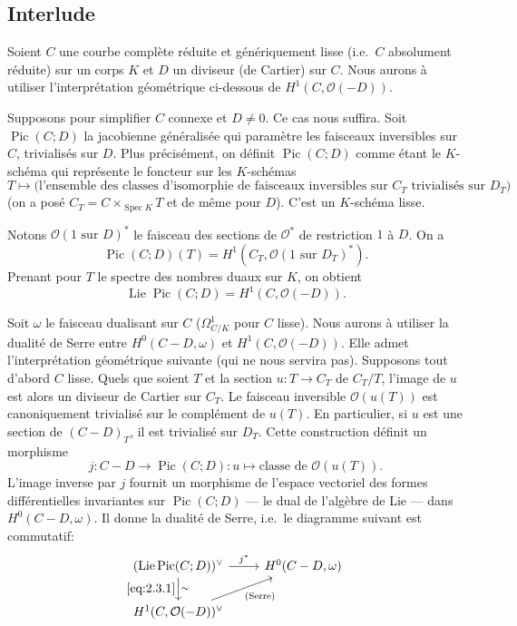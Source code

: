 \documentclass[12pt,a4paper]{article}
\theoremstyle{plain}
\theoremstyle{definition}
\theoremstyle{remark}
\DeclareMathOperator{\Spec}{Spec}
\DeclareMathOperator{\Lie}{Lie}
\DeclareMathOperator{\Pic}{Pic}
\newcommand{\OO}{\mathcal{O}}
\providecommand{\Spec}{\operatorname{Spec}}
\providecommand{\Lie}{\operatorname{Lie}}
\begin{document}
\subsection{Interlude}

Soient $C$ une courbe complète réduite et génériquement lisse (i.e.\ $C$
absolument réduite) sur un corps $K$ et $D$ un diviseur (de Cartier) sur $C$. Nous
aurons à utiliser l'interprétation géométrique ci-dessous de $H^1(C,\OO(-D))$.

Supposons pour simplifier $C$ connexe et $D\neq 0$. Ce cas nous suffira. Soit
$\Pic(C;D)$ la jacobienne généralisée qui paramètre les faisceaux inversibles sur
$C$, trivialisés sur $D$. Plus précisément, on définit $\Pic(C;D)$ comme étant le $K$-
schéma qui représente le foncteur sur les $K$-schémas
\[
T\mapsto\text{(l'ensemble des classes d'isomorphie de faisceaux inversibles sur $C_T$ trivialisés sur $D_T$)}
\]
(on a posé $C_T=C\times_{\Spec K}T$ et de même pour $D$). C'est un $K$-schéma lisse.

Notons $\OO(\text{1 sur }D)^*$ le faisceau des sections de $\OO^*$ de restriction $1$ à $D$. On a
\[
\Pic(C;D)(T)=H^1(C_T,\OO(\text{1 sur }D_T)^*).
\]
Prenant pour $T$ le spectre des nombres duaux sur $K$, on obtient
\begin{equation}\label{eq:2.3.1}
\Lie\Pic(C;D)=H^1(C,\OO(-D)).
\end{equation}

Soit $\omega$ le faisceau dualisant sur $C$ ($\Omega^1_{C/K}$ pour $C$ lisse). Nous aurons à
utiliser la dualité de Serre entre $H^0(C-D,\omega)$ et $H^1(C,\OO(-D))$. Elle admet
l'interprétation géométrique suivante (qui ne nous servira pas). Supposons tout
d'abord $C$ lisse. Quels que soient $T$ et la section $u:T\to C_T$ de $C_T/T$, l'image de
$u$ est alors un diviseur de Cartier sur $C_T$. Le faisceau inversible $\OO(u(T))$ est
canoniquement trivialisé sur le complément de $u(T)$. En particulier, si $u$ est une
section de $(C-D)_T$, il est trivialisé sur $D_T$. Cette construction définit un morphisme
\begin{equation}\label{eq:2.3.2}
j:C-D\to\Pic(C;D):u\mapsto\text{classe de }\OO(u(T)).
\end{equation}
L'image inverse par $j$ fournit un morphisme de l'espace vectoriel des formes
différentielles invariantes sur $\Pic(C;D)$ --- le dual de l'algèbre de Lie --- dans
$H^0(C-D,\omega)$. Il donne la dualité de Serre, i.e.\ le diagramme suivant est
commutatif:
\[
\begin{tikzcd}
(\Lie\Pic(C;D))^\vee \ar[r,"j^*"] \ar[d,"\eqref{eq:2.3.1}"',"\sim"] & H^0(C-D,\omega) \\
H^1(C,\OO(-D))^\vee \ar[ur,"{\text{(Serre)}}"'] &
\end{tikzcd}
\]
\end{document}
